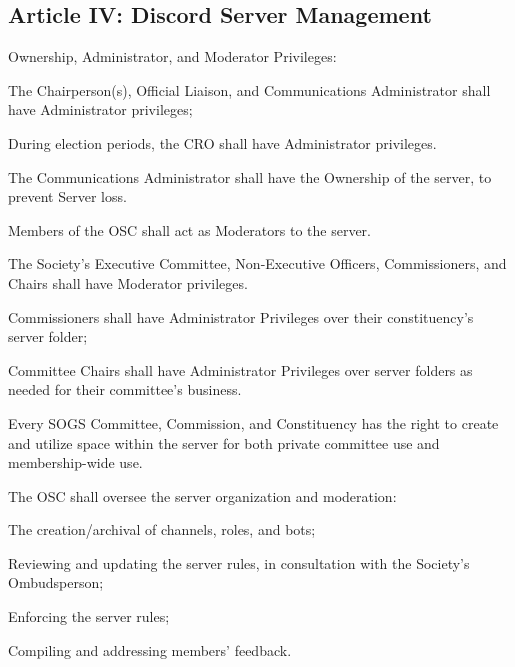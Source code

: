\subsection{Article IV: Discord Server Management}
\begin{longenum}[ label*=\thesubsection.\arabic*., align=left] 
	\item Ownership, Administrator, and Moderator Privileges:
		\begin{longenum}[label*=\arabic*., align=left]
		\item The Chairperson(s), Official Liaison, and Communications Administrator shall have Administrator privileges;
			\begin{longenum}[label*=\arabic*., align=left]
			\item During election periods, the CRO shall have Administrator privileges.
			\end{longenum}	
		\item The Communications Administrator shall have the Ownership of the server, to prevent Server loss.
		\item Members of the OSC shall act as Moderators to the server.
		\item The Society's Executive Committee, Non-Executive Officers, Commissioners, and Chairs shall have Moderator privileges.
			\begin{longenum}[label*=\arabic*., align=left]
			\item Commissioners shall have Administrator Privileges over their constituency's server folder;
			\item Committee Chairs shall have Administrator Privileges over server folders as needed for their committee's business.
			\end{longenum}	
		\end{longenum}	
	\item Every SOGS Committee, Commission, and Constituency has the right to create and utilize space within the server for both private committee use and membership-wide use.
	\item The OSC shall oversee the server organization and moderation:
		\begin{longenum}[label*=\arabic*., align=left]
		\item The creation/archival of channels, roles, and bots;
		\item Reviewing and updating the server rules, in consultation with the Society's Ombudsperson;
		\item Enforcing the server rules;
		\item Compiling and addressing members' feedback.

\end{longenum}
\end{longenum}
